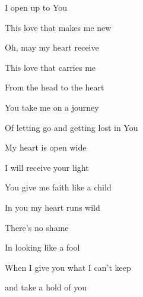 \documentclass[9pt]{extarticle}
\begin{document}
\bsong

\bv
I open up to You

This love that makes me new

Oh, may my heart receive

This love that carries me
\ev

\bc
From the head to the heart

You take me on a journey

Of letting go and getting lost in You
\ec

\bv
My heart is open wide

I will receive your light

You give me faith like a child

In you my heart runs wild
\ev

\bc
There’s no shame

In looking like a fool

When I give you what I can’t keep

and take a hold of you
\ec

\esong
\end{document}
